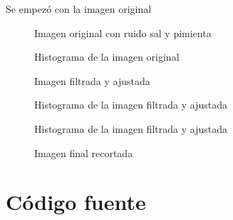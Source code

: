 \documentclass[10pt,journal,compsoc]{IEEEtran}
\begin{document}
\graphicspath{{ReporteImagenes/}}
Se empezó con la imagen original


\begin{figure}[!h]
	\caption{Imagen original con ruido sal y pimienta}
	\centering
\end{figure}


\begin{figure}[!h]
	\caption{Histograma de la imagen original}
	\centering
\end{figure}


\begin{figure}[!h]
	\caption{Imagen filtrada y ajustada}
	\centering
\end{figure}


\begin{figure}[!h]
	\caption{Histograma de la imagen filtrada y ajustada}
	\centering
\end{figure}


\begin{figure}[!h]
	\caption{Histograma de la imagen filtrada y ajustada}
	\centering
\end{figure}


\begin{figure}[!h]
	\caption{Imagen final recortada}
	\centering
\end{figure}



\section{Código fuente}
\end{document}
